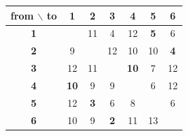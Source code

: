 \begin{tabular}{c|cccccc}
from $\backslash$ to & 1 & 2 & 3 & 4 & 5 & 6\\\hline
\textbf{1} & \cellcolor{black!12} & 11 & 4 & 12 & \cellcolor{yellow!60}\textbf{5} & 6\\
\textbf{2} & 9 & \cellcolor{black!12} & 12 & 10 & 10 & \cellcolor{yellow!60}\textbf{4}\\
\textbf{3} & 12 & 11 & \cellcolor{black!12} & \cellcolor{yellow!60}\textbf{10} & 7 & 12\\
\textbf{4} & \cellcolor{yellow!60}\textbf{10} & 9 & 9 & \cellcolor{black!12} & 6 & 12\\
\textbf{5} & 12 & \cellcolor{yellow!60}\textbf{3} & 6 & 8 & \cellcolor{black!12} & 6\\
\textbf{6} & 10 & 9 & \cellcolor{yellow!60}\textbf{2} & 11 & 13 & \cellcolor{black!12}\\
\end{tabular}
